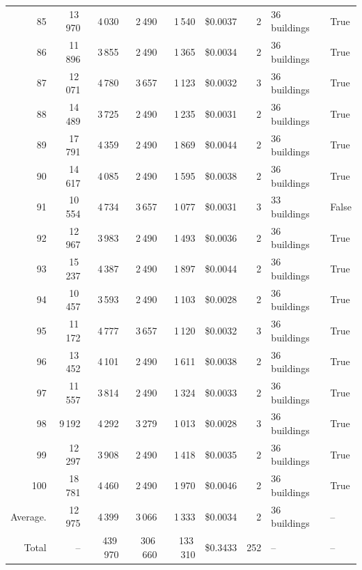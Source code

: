 \documentclass[a4paper,11pt]{article}
\begin{document}
\begin{table}[ht]
\begin{tabular}{r r r r r r r p{3cm} l}
85 & 13\,970 & 4\,030 & 2\,490 & 1\,540 & \$0.0037 & 2 & 36 buildings & True \\
86 & 11\,896 & 3\,855 & 2\,490 & 1\,365 & \$0.0034 & 2 & 36 buildings & True \\
87 & 12\,071 & 4\,780 & 3\,657 & 1\,123 & \$0.0032 & 3 & 36 buildings & True \\
88 & 14\,489 & 3\,725 & 2\,490 & 1\,235 & \$0.0031 & 2 & 36 buildings & True \\
89 & 17\,791 & 4\,359 & 2\,490 & 1\,869 & \$0.0044 & 2 & 36 buildings & True \\
90 & 14\,617 & 4\,085 & 2\,490 & 1\,595 & \$0.0038 & 2 & 36 buildings & True \\
91 & 10\,554 & 4\,734 & 3\,657 & 1\,077 & \$0.0031 & 3 & 33 buildings & False \\
92 & 12\,967 & 3\,983 & 2\,490 & 1\,493 & \$0.0036 & 2 & 36 buildings & True \\
93 & 15\,237 & 4\,387 & 2\,490 & 1\,897 & \$0.0044 & 2 & 36 buildings & True \\
94 & 10\,457 & 3\,593 & 2\,490 & 1\,103 & \$0.0028 & 2 & 36 buildings & True \\
95 & 11\,172 & 4\,777 & 3\,657 & 1\,120 & \$0.0032 & 3 & 36 buildings & True \\
96 & 13\,452 & 4\,101 & 2\,490 & 1\,611 & \$0.0038 & 2 & 36 buildings & True \\
97 & 11\,557 & 3\,814 & 2\,490 & 1\,324 & \$0.0033 & 2 & 36 buildings & True \\
98 & 9\,192 & 4\,292 & 3\,279 & 1\,013 & \$0.0028 & 3 & 36 buildings & True \\
99 & 12\,297 & 3\,908 & 2\,490 & 1\,418 & \$0.0035 & 2 & 36 buildings & True \\
100 & 18\,781 & 4\,460 & 2\,490 & 1\,970 & \$0.0046 & 2 & 36 buildings & True \\
\hline
Average. & 12\,975 & 4\,399 & 3\,066 & 1\,333 & \$0.0034 & 2 & 36 buildings & -- \\
Total & -- & 439\,970 & 306\,660 & 133\,310 & \$0.3433 & 252 & -- & -- \\
\hline
\end{tabular}
\end{table}

\clearpage
\end{document}

